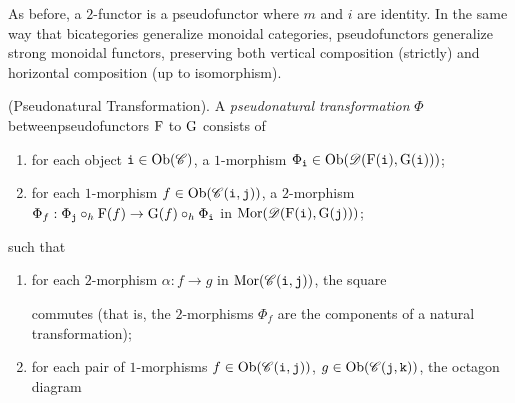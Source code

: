 \noindent As before, a $2$-functor is a pseudofunctor where $m$ and $i$ are identity. In the same way that bicategories generalize monoidal categories, pseudofunctors generalize strong monoidal functors, preserving both vertical composition (strictly) and horizontal composition (up to isomorphism).\\

\noindent\begin{definition}\textnormal{(Pseudonatural Transformation).} A {\em pseudonatural transformation} $\Phi$ between\linebreak pseudofunctors $\textnormal{F}$ to $\textnormal{G}$ consists of
\begin{enumerate}[label=$\bullet$, leftmargin=4\parindent]
\item for each object $\textnormal{\texttt{i}} \in \textnormal{Ob}(\mathscr{C})$, a $1$-morphism $\Phi_{\textnormal{\texttt{i}}} \in \textnormal{Ob}(\mathscr{D}(\textnormal{F}(\textnormal{\texttt{i}}), \textnormal{G}(\textnormal{\texttt{i}})))$;
\item for each $1$-morphism $f \in \textnormal{Ob}(\mathscr{C}(\textnormal{\texttt{i}}, \textnormal{\texttt{j}}))$, a $2$-morphism $\Phi_f : \Phi_{\textnormal{\texttt{j}}} \circ_h \textnormal{F}(f) \to \textnormal{G}(f) \circ_h \Phi_{\textnormal{\texttt{i}}}$ in $\textnormal{Mor}(\mathscr{D}(\textnormal{F}(\textnormal{\texttt{i}}), \textnormal{G}(\textnormal{\texttt{j}})))$;
\end{enumerate}
\noindent such that
\begin{enumerate}[label=$\bullet$, leftmargin=4\parindent]
\item for each $2$-morphism $\alpha : f \to g$ in $\textnormal{Mor}(\mathscr{C}(\textnormal{\texttt{i}}, \textnormal{\texttt{j}}))$, the square
\begin{center}
\end{center}
commutes (that is, the $2$-morphisms $\Phi_f$ are the components of a natural transformation);
\item for each pair of $1$-morphisms $f \in \textnormal{Ob}(\mathscr{C}(\textnormal{\texttt{i}}, \textnormal{\texttt{j}}))$, $g \in \textnormal{Ob}(\mathscr{C}(\textnormal{\texttt{j}}, \textnormal{\texttt{k}}))$, the octagon diagram
\begin{center}

\end{center}
\end{enumerate}
\end{definition}
